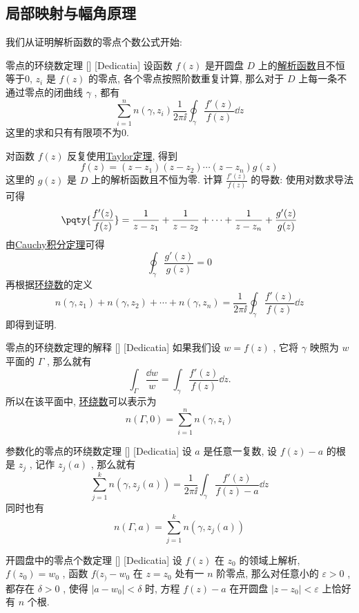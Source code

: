 \documentclass[UTF8]{ctexart}
\newcommand{\AnalyticalFunction}{\hyperref[dfn:AnalyticalFunction]{解析函数}}
\newcommand{\TaylorThm}{\hyperref[thm:Taylor]{Taylor定理}}
\newcommand{\CauchyThm}{\hyperref[thm:Cauchy]{Cauchy积分定理}}
\begin{document}
\subsection{局部映射与幅角原理}
我们从证明解析函数的零点个数公式开始: 
\begin{thm}
    [UUID]
    {零点的环绕数定理}
    []
    [Dedicatia]
    设函数 \( f(z) \) 是开圆盘 \( D \) 上的\AnalyticalFunction 且不恒等于0,  \( z_i \) 是 \( f(z) \) 的零点, 各个零点按照阶数重复计算, 那么对于 \( D \) 上每一条不通过零点的闭曲线 \( \gamma \) , 都有
    \[\sum_{i=1}^n n(\gamma, z_i)\frac{1}{2\pi\ii}\oint_\gamma\frac{f'(z)}{f(z)}\dd{z} \] 
    这里的求和只有有限项不为0.
\end{thm}
\begin{prf}
    对函数 \( f(z) \) 反复使用\TaylorThm , 得到
    \[f(z)=(z-z_1)(z-z_2)\cdots(z-z_n)g(z)\]
    这里的 \( g(z) \) 是 \( D \) 上的解析函数且不恒为零. 计算 \( \frac{f'(z)}{f(z)} \) 的导数: 使用对数求导法可得
    \[\pqty{\frac{f'(z)}{f(z)}}=\frac{1}{z-z_1}+\frac{1}{z-z_2}+\cdots+\frac{1}{z-z_n}+\frac{g'(z)}{g(z)}\]
    由\CauchyThm 可得
    \[\oint_\gamma\frac{g'(z)}{g(z)}=0 \]
    再根据\hyperref[dfn:WindingNumber]{环绕数}的定义
    \[n(\gamma,z_1)+n(\gamma,z_2)+\cdots+n(\gamma,z_n)=\frac{1}{2\pi\ii}\oint_\gamma \frac{f'(z)}{f(z)}\dd{z}\]
    即得到证明. 
\end{prf}
\begin{crl}
    [UUID]
    {零点的环绕数定理的解释}
    []
    [Dedicatia]
    如果我们设 \( w=f(z) \) , 它将 \( \gamma \) 映照为 \( w \) 平面的 \( \Gamma \) , 那么就有
    \[\int_\Gamma\frac{\dd w}{w}=\int_\gamma \frac{f'(z)}{f(z)}\dd{z}.\]
    所以在该平面中, \hyperref[dfn:WindingNumber]{环绕数}可以表示为
    \[n(\Gamma,0)=\sum_{i=1}^n n(\gamma,z_i)\]
\end{crl}
\begin{crl}
    [UUID]
    {参数化的零点的环绕数定理}
    []
    [Dedicatia]
    设 \( a \) 是任意一复数, 设 \( f(z)-a \) 的根是 \( z_j \) , 记作 \( z_j(a) \) , 那么就有
    \[\sum_{j=1}^{k}n(\gamma,z_j(a))=\frac{1}{2\pi\ii}\int_\gamma\frac{f'(z)}{f(z)-a}\dd{z}\]
    同时也有
    \[n(\Gamma,a)=\sum_{j=1}^k n(\gamma,z_j(a))\]
\end{crl}
\begin{thm}
    [UUID]
    {开圆盘中的零点个数定理}
    []
    [Dedicatia]
    设 \( f(z) \) 在 \( z_0 \) 的领域上解析,  \( f(z_0)=w_0 \) , 函数 \( f(z_)-w_0 \) 在 \( z=z_0 \) 处有一 \( n \) 阶零点, 那么对任意小的 \( \varepsilon>0 \) , 都存在 \( \delta>0 \) , 使得 \( |a-w_0|<\delta \) 时, 方程 \( f(z)-a \) 在开圆盘 \( |z-z_0|<\varepsilon \) 上恰好有 \( n \) 个根. 
\end{thm}
\end{document}
